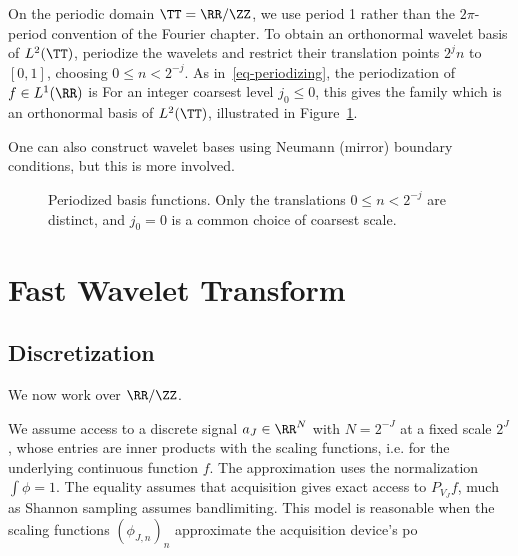 On the periodic domain $\TT=\RR/\ZZ$, we use period 1 rather than the $2\pi$-period convention of the Fourier chapter. To obtain an orthonormal wavelet basis of $L^2(\TT)$, periodize the wavelets and restrict their translation points $2^j n$ to $[0,1]$, choosing $0 \leq n < 2^{-j}$. As in~\eqref{eq-periodizing}, the periodization of $f \in L^1(\RR)$ is
For an integer coarsest level $j_0\leq0$, this gives the family
which is an orthonormal basis of $L^2(\TT)$, illustrated in Figure~\ref{fig-periodize}.
 
One can also construct wavelet bases using Neumann (mirror) boundary conditions, but this is more involved.



\begin{figure}[tbp]
\centering
{}\hfill
{}
\caption{Periodized basis functions. Only the translations $0\leq n<2^{-j}$ are distinct, and $j_0=0$ is a common choice of coarsest scale.}
\label{fig-periodize}
\end{figure}



                                                   
\section{Fast Wavelet Transform}\label{sec-fast-wavelet-transform}

   
\subsection{Discretization}

We now work over $\RR/\ZZ$.
 
We assume access to a discrete signal $a_J \in \RR^N$ with $N = 2^{-J}$ at a fixed scale $2^J$, whose entries are inner products with the scaling functions, i.e.
for the underlying continuous function $f$. The approximation uses the normalization $\int\phi=1$. The equality assumes that acquisition gives exact access to $P_{V_J}f$, much as Shannon sampling assumes bandlimiting. This model is reasonable when the scaling functions $(\phi_{J,n})_n$ approximate the acquisition device's po